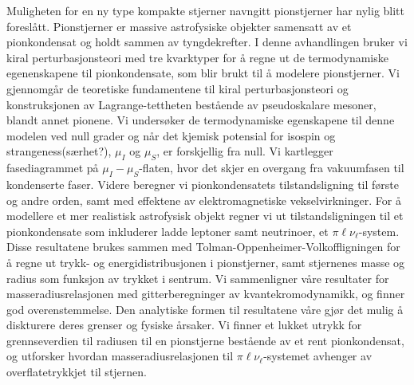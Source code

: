 Muligheten for en ny type kompakte stjerner navngitt pionstjerner har nylig blitt foreslått.
Pionstjerner er massive astrofysiske objekter samensatt av et pionkondensat og holdt sammen av tyngdekrefter.
I denne avhandlingen bruker vi kiral perturbasjonsteori med tre kvarktyper for å regne ut de termodynamiske egenenskapene til pionkondensate, som blir brukt til å modelere pionstjerner.
Vi gjennomgår de teoretiske fundamentene til kiral perturbasjonsteori og konstruksjonen av Lagrange-tettheten bestående av pseudoskalare mesoner, blandt annet pionene.
Vi undersøker de termodynamiske egenskapene til denne modelen ved null grader og når det kjemisk potensial for isospin og strangeness(særhet?), $\mu_I$ og $\mu_S$, er forskjellig fra null.
Vi kartlegger fasediagrammet på $\mu_I-\mu_S$-flaten, hvor det skjer en overgang fra vakuumfasen til kondenserte faser.
Videre beregner vi  pionkondensatets tilstandsligning til første og andre orden, samt med effektene av elektromagnetiske vekselvirkninger.
For å modellere et mer realistisk astrofysisk objekt regner vi ut tilstandsligningen til et pionkondensate som inkluderer ladde leptoner samt neutrinoer, et $\pi\ell\nu_\ell$-system.
Disse resultatene brukes sammen med Tolman-Oppenheimer-Volkoffligningen for å regne ut trykk- og energidistribusjonen i pionstjerner, samt stjernenes masse og radius som funksjon av trykket i sentrum.
Vi sammenligner våre resultater for masseradiusrelasjonen med gitterberegninger av kvantekromodynamikk, og finner god overenstemmelse.
Den analytiske formen til resultatene våre gjør det mulig å diskturere deres grenser og fysiske årsaker.
Vi finner et lukket utrykk for grennseverdien til radiusen til en pionstjerne bestående av et rent pionkondensat, og utforsker hvordan masseradiusrelasjonen til $\pi\ell\nu_\ell$-systemet avhenger av overflatetrykkjet til stjernen.

